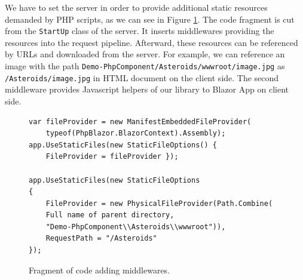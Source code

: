 We have to set the server in order to provide additional static resources demanded by PHP scripts, as we can see in Figure \ref{img19:settings}.
The code fragment is cut from the \texttt{StartUp} class of the server.
It inserts middlewares providing the resources into the request pipeline.
Afterward, these resources can be referenced by URLs and downloaded from the server.
For example, we can reference an image with the path \texttt{Demo-PhpComponent/Asteroids/wwwroot/image.jpg} as \texttt{/Asteroids/image.jpg} in HTML document on the client side.
The second middleware provides Javascript helpers of our library to Blazor App on client side.
\par
\begin{figure}[t]
\begin{lstlisting}
var fileProvider = new ManifestEmbeddedFileProvider(
	typeof(PhpBlazor.BlazorContext).Assembly);
app.UseStaticFiles(new StaticFileOptions() { 
	FileProvider = fileProvider });

app.UseStaticFiles(new StaticFileOptions
{
	FileProvider = new PhysicalFileProvider(Path.Combine(
	Full name of parent directory, 
	"Demo-PhpComponent\\Asteroids\\wwwroot")),
	RequestPath = "/Asteroids"
});
\end{lstlisting}
\caption{Fragment of code adding middlewares.}
\label{img19:settings}
\end{figure}
            
 